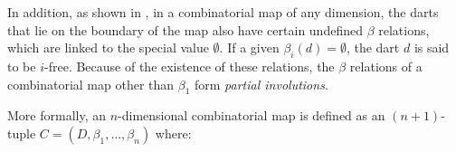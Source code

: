 In addition, as shown in , in a combinatorial map of any dimension, the darts that lie on the boundary of the map also have certain undefined $\beta$ relations, which are linked to the special value $\emptyset$.
If a given $\beta_i(d) = \emptyset$, the dart $d$ is said to be $i$-free.
Because of the existence of these relations, the $\beta$ relations of a combinatorial map other than $\beta_1$ form \emph{partial involutions}.

More formally, an $n$-dimensional combinatorial map is defined as an $(n+1)$-tuple $C = (D, \beta_{1}, \ldots, \beta_{n})$ where:

